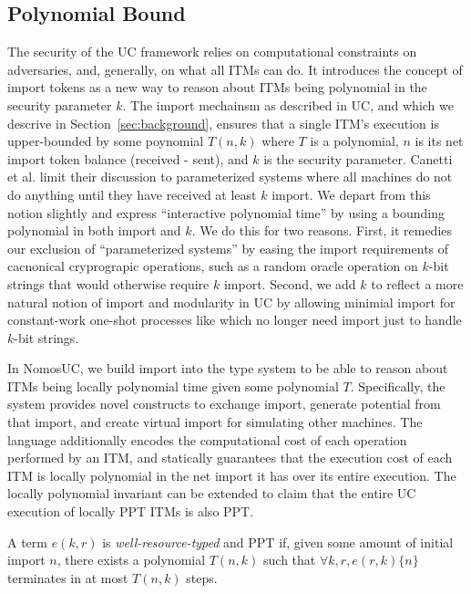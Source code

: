 \subsection{Polynomial Bound}
The security of the UC framework relies on computational constraints on adversaries, and, generally, on what all ITMs can do.
It introduces the concept of import tokens as a new way to reason about ITMs being polynomial in the security parameter $k$. 
The import mechainsm as described in UC, and which we descrive in Section~\ref{sec:background}, ensures that a single ITM's execution is upper-bounded by some poynomial $T(n,k)$ where $T$ is a polynomial, $n$ is its net import token balance (received - sent), and $k$ is the security parameter.
Canetti et al. limit their discussion to parameterized systems where all machines do not do anything until they have received at least $k$ import.
We depart from this notion slightly and express ``interactive polynomial time'' by using a bounding polynomial in both import and $k$.
We do this for two reasons.
First, it remedies our exclusion of ``parameterized systems'' by easing the import requirements of cacnonical cryprograpic operations, such as a random oracle operation on $k$-bit strings that would otherwise require $k$ import. 
Second, we add $k$ to reflect a more natural notion of import and modularity in UC by allowing minimial import for constant-work one-shot processes like \Fcom which no longer need import just to handle $k$-bit strings.

In NomosUC, we build import into the type system to be able to reason about ITMs being locally polynomial time given some polynomial $T$.
Specifically, the system provides novel constructs to exchange import, generate potential from that import, and create virtual import for simulating other machines.
The language additionally encodes the computational cost of each operation performed by an ITM, and statically guarantees that the execution cost of each ITM is locally polynomial in the net import it has over its entire execution. 
The locally polynomial invariant can be extended to claim that the entire UC execution of locally PPT ITMs is also PPT.

\begin{ddef}[PPT in $k$]\label{def:ppt}
A term $e(k,r)$ is \emph{well-resource-typed} and PPT if, given some amount of initial import $n$, there exists a polynomial $T(n,k)$ such that $\forall k, r, e(r,k) \{n\}$ terminates in at most $T(n,k)$ steps. 
\end{ddef}

